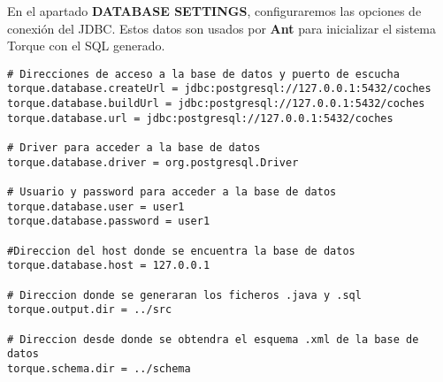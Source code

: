 En el apartado {\bf DATABASE SETTINGS}, configuraremos las opciones de conexión del JDBC. Estos datos son usados por {\bf Ant} para inicializar el sistema Torque con el SQL generado.
\begin{lstlisting}
# Direcciones de acceso a la base de datos y puerto de escucha
torque.database.createUrl = jdbc:postgresql://127.0.0.1:5432/coches
torque.database.buildUrl = jdbc:postgresql://127.0.0.1:5432/coches
torque.database.url = jdbc:postgresql://127.0.0.1:5432/coches

# Driver para acceder a la base de datos
torque.database.driver = org.postgresql.Driver

# Usuario y password para acceder a la base de datos
torque.database.user = user1
torque.database.password = user1

#Direccion del host donde se encuentra la base de datos
torque.database.host = 127.0.0.1

# Direccion donde se generaran los ficheros .java y .sql
torque.output.dir = ../src

# Direccion desde donde se obtendra el esquema .xml de la base de datos
torque.schema.dir = ../schema
\end{lstlisting}